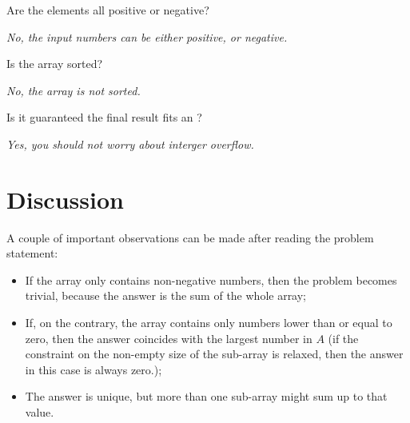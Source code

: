 \begin{QandA}
	\item \begin{questionitem} \begin{question} Are the elements all positive or negative?  \end{question} 	 
    \begin{answered}
		\textit{No, the input numbers can be either positive, or negative.}
	\end{answered} \end{questionitem}
	
	\item \begin{questionitem} \begin{question} Is the array sorted?  \end{question} 	 
    \begin{answered}
		\textit{No, the array is not sorted.}
	\end{answered} \end{questionitem}

	\item \begin{questionitem} \begin{question} Is it guaranteed the final result fits an ?  \end{question} 	 
    \begin{answered}
		\textit{Yes, you should not worry about interger overflow.}
	\end{answered} \end{questionitem}
	
\end{QandA}

\section{Discussion}
\label{max_sum_continguous_subarray:sec:discussion}
A couple of important observations can be made after reading the problem statement:
\begin{itemize}
	\item If the array only contains non-negative numbers, then the problem becomes trivial, because the answer is the sum of the whole array;
	\item If, on the contrary, the array contains only  numbers lower than or equal to zero, then the answer coincides with the largest number in $A$ (if the constraint on the non-empty size of the sub-array is relaxed, then the answer in this case is always zero.);
	\item  The answer is unique, but more than one sub-array might sum up to that value.
\end{itemize}

